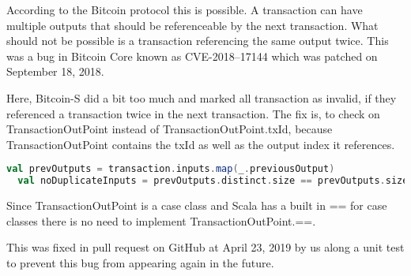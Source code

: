 According to the Bitcoin protocol this is possible.
A transaction can have multiple outputs that should be referenceable by the next transaction.
What should not be possible is a transaction referencing the same output twice.
This was a bug in Bitcoin Core known as CVE-2018–17144 which was patched on September 18, 2018.

Here, Bitcoin-S did a bit too much and marked all transaction as invalid, if they referenced a transaction twice in the next transaction.
The fix is, to check on TransactionOutPoint instead of TransactionOutPoint.txId, because TransactionOutPoint contains the txId as well as the output index it references.
\begin{lstlisting}[language=scala]
  val prevOutputs = transaction.inputs.map(_.previousOutput)
  val noDuplicateInputs = prevOutputs.distinct.size == prevOutputs.size
\end{lstlisting}
Since TransactionOutPoint is a case class and Scala has a built in == for case classes there is no need to implement TransactionOutPoint.==.

This was fixed in pull request  on GitHub at April 23, 2019 by us along a unit test to prevent this bug from appearing again in the future.
